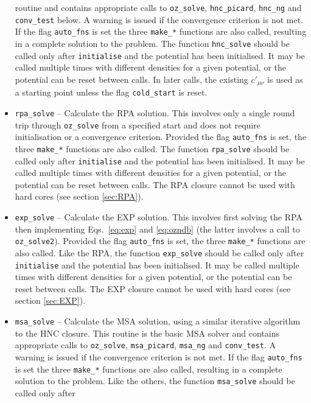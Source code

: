 \documentclass[12pt,a4paper]{article}
\newcommand{\Eqsref}[1]{Eqs.~\eqref{#1}}
\begin{document}
\begin{itemize}
  routine and contains appropriate calls to \verb+oz_solve+,
  \verb+hnc_picard+, \verb+hnc_ng+ and \verb+conv_test+ below.  A
  warning is issued if the convergence criterion is not met.  If the
  flag \verb+auto_fns+ is set the three \verb+make_*+ functions are
  also called, resulting in a complete solution to the problem.  The
  function \verb+hnc_solve+ should be called only after
  \verb+initialise+ and the potential has been initialised.  It may be
  called multiple times with different densities for a given
  potential, or the potential can be reset between calls.  In
  later calls, the existing $c'_{\mu\nu}$ is used as a
  starting point unless the flag \verb+cold_start+ is reset.
%
\item\verb+rpa_solve+ -- Calculate the RPA solution.  This involves
  only a single round trip through \verb+oz_solve+ from a specified
  start and does not require initialisation or a convergence
  criterion.  Provided the flag \verb+auto_fns+ is set, the three
  \verb+make_*+ functions are also called. The function
  \verb+rpa_solve+ should be called only after \verb+initialise+ and
  the potential has been initialised.  It may be called multiple times
  with different densities for a given potential, or the potential can
  be reset between calls.  The RPA closure cannot be used with
  hard cores (see section \ref{sec:RPA}).
%
\item\verb+exp_solve+ -- Calculate the EXP solution.  This involves
  first solving the RPA then implementing \Eqsref{eq:exp} and
  \eqref{eq:ozndb} (the latter involves a call to \verb+oz_solve2+).
  Provided the flag \verb+auto_fns+ is set, the three \verb+make_*+
  functions are also called. Like the RPA, the function
  \verb+exp_solve+ should be called only after \verb+initialise+ and
  the potential has been initialised.  It may be called multiple times
  with different densities for a given potential, or the potential can
  be reset between calls. The EXP closure cannot be used with
  hard cores (see section \ref{sec:EXP}).
%
\item\verb+msa_solve+ -- Calculate the MSA solution, using a similar
  iterative algorithm to the HNC closure. This routine is the basic
  MSA solver and contains appropriate calls to \verb+oz_solve+,
  \verb+msa_picard+, \verb+msa_ng+ and \verb+conv_test+.  A warning is
  issued if the convergence criterion is not met.  If the flag
  \verb+auto_fns+ is set the three \verb+make_*+ functions are also
  called, resulting in a complete solution to the problem.  Like the
  others, the function \verb+msa_solve+ should be called only after

\end{itemize}
\end{document}
